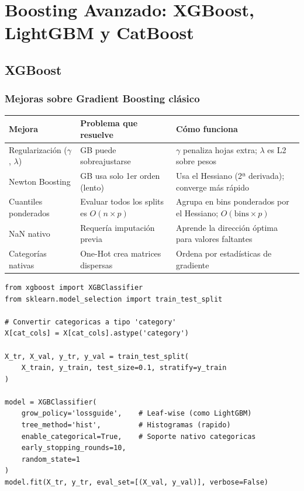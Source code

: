 \documentclass[11pt, a4paper]{book}
\begin{document}
\chapter{Boosting Avanzado: XGBoost, LightGBM y CatBoost}

\section{XGBoost}

\subsection{Mejoras sobre Gradient Boosting clásico}

\begin{resumen}
  \begin{tabular}{lp{5.5cm}p{4.5cm}}
    \toprule
    \textbf{Mejora} & \textbf{Problema que resuelve} & \textbf{Cómo funciona}\\
    \midrule
    Regularización ($\gamma$, $\lambda$) & GB puede sobreajustarse & $\gamma$ penaliza hojas extra;
      $\lambda$ es L2 sobre pesos\\
    Newton Boosting & GB usa solo 1er orden (lento) & Usa el Hessiano (2ª derivada);
      converge más rápido\\
    Cuantiles ponderados & Evaluar todos los splits es $O(n{\times}p)$ & Agrupa en bins ponderados
      por el Hessiano; $O(\text{bins}{\times}p)$\\
    NaN nativo & Requería imputación previa & Aprende la dirección óptima para valores faltantes\\
    Categorías nativas & One-Hot crea matrices dispersas & Ordena por estadísticas de gradiente\\
    \bottomrule
  \end{tabular}
\end{resumen}

\begin{lstlisting}[caption={XGBoost con early stopping y categorías nativas}]
from xgboost import XGBClassifier
from sklearn.model_selection import train_test_split

# Convertir categoricas a tipo 'category'
X[cat_cols] = X[cat_cols].astype('category')

X_tr, X_val, y_tr, y_val = train_test_split(
    X_train, y_train, test_size=0.1, stratify=y_train
)

model = XGBClassifier(
    grow_policy='lossguide',    # Leaf-wise (como LightGBM)
    tree_method='hist',         # Histogramas (rapido)
    enable_categorical=True,    # Soporte nativo categoricas
    early_stopping_rounds=10,
    random_state=1
)
model.fit(X_tr, y_tr, eval_set=[(X_val, y_val)], verbose=False)
\end{lstlisting}
\end{document}
